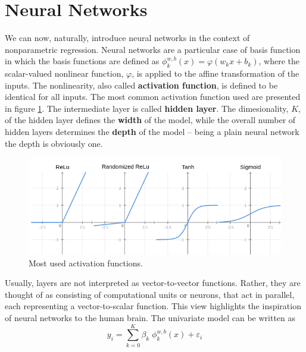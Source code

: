 \section{Neural Networks}
We can now, naturally, introduce neural networks in the context of nonparametric regression. Neural networks are a particular case of basis function in which the basis functions are defined as $\phi_k^{w, b}(x) = \varphi(w_k x + b_k)$, where the scalar-valued nonlinear function, $\varphi$, is applied to the affine transformation of the inputs. The nonlinearity, also called \textbf{activation function}, is defined to be identical for all inputs. The most common activation function used are presented in figure \ref{fig:activation_functions}. The intermediate layer is called \textbf{hidden layer}. The dimesionality, $K$, of the hidden layer defines the \textbf{width} of the model, while the overall number of hidden layers determines the \textbf{depth} of the model -- being a plain neural network the depth is obviously one. 
\begin{figure}[ht]
    \centering
    \includegraphics[width=\textwidth]{images/activations.png}
    \caption{Most used activation functions.}
    \label{fig:activation_functions}
\end{figure}
Usually, layers are not interpreted as vector-to-vector functions. Rather, they are thought of as consisting of computational units or neurons, that act in parallel, each representing a vector-to-scalar function. This view highlights the inspiration of neural networks to the human brain. The univariate model can be written as
$$y_i = \sum_{k=0}^{K} \beta_k \; \phi_k^{w, b}(x) + \varepsilon_i$$
